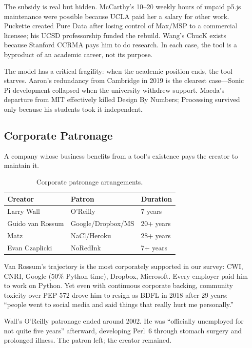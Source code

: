 \documentclass[10pt,letterpaper,twocolumn]{article}
\begin{document}
The subsidy is real but hidden. McCarthy's 10--20 weekly hours of unpaid p5.js maintenance were possible because UCLA paid her a salary for other work. Puckette created Pure Data after losing control of Max/MSP to a commercial licensee; his UCSD professorship funded the rebuild. Wang's ChucK exists because Stanford CCRMA pays him to do research. In each case, the tool is a byproduct of an academic career, not its purpose.

The model has a critical fragility: when the academic position ends, the tool starves. Aaron's redundancy from Cambridge in 2019 is the clearest case---Sonic Pi development collapsed when the university withdrew support. Maeda's departure from MIT effectively killed Design By Numbers; Processing survived only because his students took it independent.

\subsection{Corporate Patronage}

A company whose business benefits from a tool's existence pays the creator to maintain it.

\begin{table}[h]
\small
\centering
\begin{tabularx}{\linewidth}{XXX}
\toprule
\textbf{Creator} & \textbf{Patron} & \textbf{Duration} \\
\midrule
Larry Wall & O'Reilly & 7 years \\
Guido van Rossum & Google/Dropbox/MS & 20+ years \\
Matz & NaCl/Heroku & 28+ years \\
Evan Czaplicki & NoRedInk & 7+ years \\
\bottomrule
\end{tabularx}
\caption{Corporate patronage arrangements.}
\label{tab:corporate}
\end{table}

Van Rossum's trajectory is the most corporately supported in our survey: CWI, CNRI, Google (50\% Python time), Dropbox, Microsoft. Every employer paid him to work on Python. Yet even with continuous corporate backing, community toxicity over PEP 572 drove him to resign as BDFL in 2018 after 29 years: ``people went to social media and said things that really hurt me personally.''

Wall's O'Reilly patronage ended around 2002. He was ``officially unemployed for not quite five years'' afterward, developing Perl~6 through stomach surgery and prolonged illness. The patron left; the creator remained.
\end{document}
